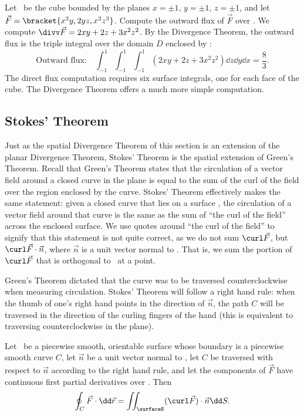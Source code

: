 \begin{example}\label{ex_divthm_space4}
Let \surfaceS\ be the cube bounded by the planes $x=\pm 1$, $y=\pm 1$, $z=\pm 1$, and let $\vec F =\bracket{x^2y,2yz,x^2z^3}$. Compute the outward flux of $\vec F$ over \surfaceS.
\solution
We compute $\divv \vec F = 2xy+2z+3x^2z^2$. By the Divergence Theorem, the outward flux is the triple integral over the domain $D$ enclosed by \surfaceS:
\[
\text{Outward flux:}
\quad \int_{-1}^1\int_{-1}^1\int_{-1}^1(2xy+2z+3x^2z^2)\dd z\dd y\dd x = \frac83.
\]
The direct flux computation requires six surface integrals, one for each face of the cube. The Divergence Theorem offers a much more simple computation.
\end{example}

\subsection{Stokes' Theorem}

Just as the spatial Divergence Theorem of this section is an extension of the planar Divergence Theorem, Stokes' Theorem is the spatial extension of Green's Theorem. Recall that Green's Theorem states that the circulation of a vector field around a closed curve in the plane is equal to the sum of the curl of the field over the region enclosed by the curve. Stokes' Theorem effectively makes the same statement: given a closed curve that lies on a surface \surfaceS, the circulation of a vector field around that curve is the same as the sum of ``the curl of the field'' across the enclosed surface. We use quotes around ``the curl of the field'' to signify that this statement is not quite correct, as we do not sum $\curl \vec F$, but $\curl \vec F\cdot\vec n$, where $\vec n$ is a unit vector normal to \surfaceS. That is, we sum the portion of $\curl \vec F$ that is orthogonal to \surfaceS\ at a point.

Green's Theorem dictated that the curve was to be traversed counterclockwise when measuring circulation. Stokes' Theorem will follow a right hand rule: when the thumb of one's right hand points in the direction of $\vec n$, the path $C$ will be traversed in the direction of the curling fingers of the hand (this is equivalent to traversing counterclockwise in the plane).

\begin{theorem}\label{thm:stokes_thm}
Let \surfaceS\ be a piecewise smooth, orientable surface whose boundary is a piecewise smooth curve $C$, let $\vec n$ be a unit vector normal to \surfaceS, let $C$ be traversed with respect to $\vec n$ according to the right hand rule, and let the components of $\vec F$ have continuous first partial derivatives over \surfaceS. Then
\[\oint_C \vec F\cdot\dd\vec r = \iint_\surfaceS (\curl\vec F)\cdot \vec n\dd S.\]
\end{theorem}

